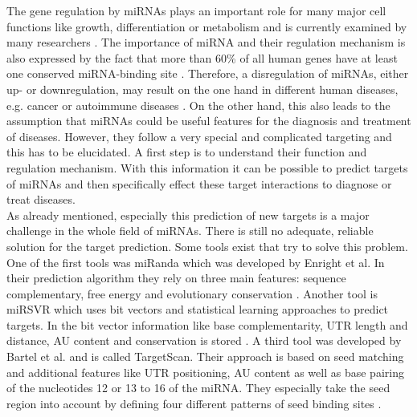 \documentclass[11pt, a4paper, oneside]{book}
\begin{document}
The gene regulation by miRNAs plays an important role for many major cell functions like growth, differentiation or metabolism and is currently examined by many researchers \cite{Ardekani}. The importance of miRNA and their regulation mechanism is also expressed by the fact that more than 60\% of all human genes have at least one conserved miRNA-binding site \cite{Friedman}. Therefore, a disregulation of miRNAs, either up- or downregulation, may result on the one hand in different human diseases, e.g. cancer or autoimmune diseases \cite{Ardekani}. On the other hand, this also leads to the assumption that miRNAs could be useful features for the diagnosis and treatment of diseases. However, they follow a very special and complicated targeting and this has to be elucidated. A first step is to understand their function and regulation mechanism. With this information it can be possible to predict targets of miRNAs and then specifically effect these target interactions to diagnose or treat diseases. \\

As already mentioned, especially this prediction of new targets is a major challenge in the whole field of miRNAs. There is still no adequate, reliable solution for the target prediction. Some tools exist that try to solve this problem. One of the first tools was miRanda which was developed by Enright et al. In their prediction algorithm they rely on three main features: sequence complementary, free energy and evolutionary conservation \cite{Enright}. Another tool is miRSVR which uses bit vectors and statistical learning approaches to predict targets. In the bit vector information like base complementarity, UTR length and distance, AU content and conservation is stored \cite{Betel}. A third tool was developed by Bartel et al. and is called TargetScan. Their approach is based on seed matching and additional features like UTR positioning, AU content as well as base pairing of the nucleotides 12 or 13 to 16 of the miRNA. They especially take the seed region into account by defining four different patterns of seed binding sites \cite{Lewis}.\\
\end{document}
